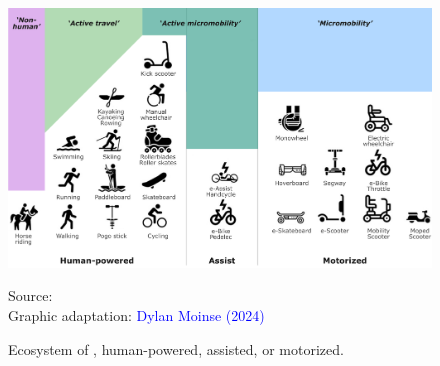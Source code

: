 \begin{refsegment}
\begin{figure}[h!]\vspace*{4pt}
        \caption{Ecosystem of , human-powered, assisted, or motorized.}
        \label{fig-chap1:ecosysteme-micromobilite}
        \centerline{\includegraphics[width=1\columnwidth]{src/Figures/Chap-1/EN_Ecosysteme_micromobilite.pdf}}
        \vspace{5pt}
        \begin{flushright}\scriptsize{
        Source: \textcolor{blue}{\textcite[155]{cook_more_2022}}
        \\
        Graphic adaptation: \textcolor{blue}{Dylan Moinse (2024)}
        }\end{flushright}
    \end{figure}


\end{refsegment}
